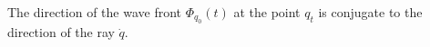 The direction of the wave front $\Phi_{q_0}(t)$ at the point $q_t$ is conjugate to the direction of the ray $\dot{q}$.
